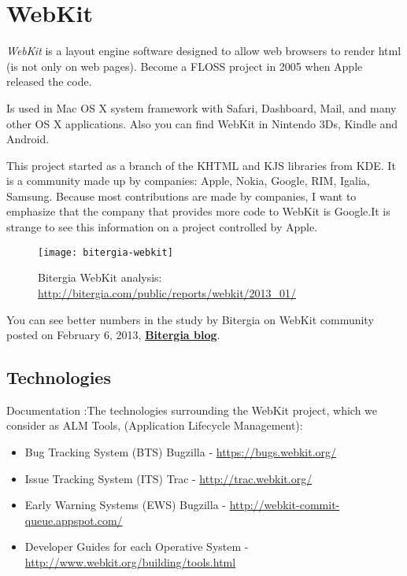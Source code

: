 \section{WebKit}
\label{sec:webkit}

\par \emph{WebKit} is a layout engine software designed to allow web browsers to render html (is not only on web pages). Become a FLOSS project in 2005 when Apple released the code.

\par Is used in Mac OS X system framework with Safari, Dashboard, Mail, and many other OS X applications. Also you can find WebKit in Nintendo 3Ds, Kindle and Android.

\par This project started as a branch of the KHTML and KJS libraries from KDE. It is a community made ​​up by companies: Apple, Nokia, Google, RIM, Igalia, Samsung. Because most contributions are made by companies, I want to emphasize that the company that provides more code to WebKit is Google.It is strange to see this information on a project controlled by Apple.

\begin{figure}[H]
    \centering
    \texttt{[image: bitergia-webkit]}
    \caption{Bitergia WebKit analysis: \url{http://bitergia.com/public/reports/webkit/2013_01/}}
    \label{}
\end{figure}

\par You can see better numbers in the study by Bitergia on WebKit community posted on February 6, 2013,\textbf{ \href{http://blog.bitergia.com/2013/02/06/report-on-the-activity-of-companies-in-the-webkit-project/}{Bitergia blog}}.

\subsection{Technologies}

\par Documentation :The technologies surrounding the WebKit project, which we consider as ALM Tools, (Application Lifecycle Management):

\begin{itemize}
	\item Bug Tracking System (BTS) Bugzilla - \url{https://bugs.webkit.org/}
	\item Issue Tracking System (ITS) Trac - \url{http://trac.webkit.org/}
	\item Early Warning Systems (EWS) Bugzilla - \url{http://webkit-commit-queue.appspot.com/}
	\item Developer Guides for each Operative System - \url{http://www.webkit.org/building/tools.html}
\end{itemize}

